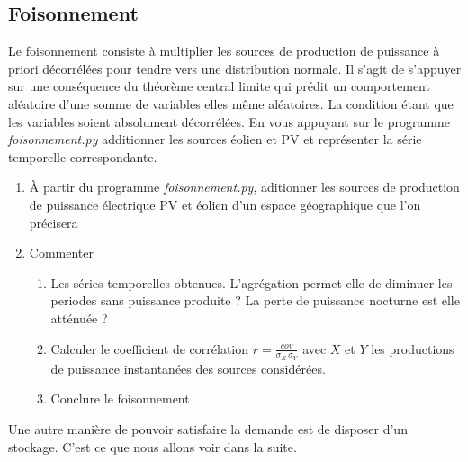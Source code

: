\documentclass[12pt,french]{article}
\newcommand{\tmtextit}[1]{{\itshape{#1}}}
\begin{document}
\subsection{Foisonnement}

Le foisonnement consiste à multiplier les sources de production de puissance
à priori décorrélées pour tendre vers une distribution normale. Il s'agit de s'appuyer sur une conséquence du théorème central limite qui prédit un
comportement aléatoire d'une somme de variables elles même aléatoires. La
condition étant que les variables soient absolument décorrélées. En vous
appuyant sur le programme \tmtextit{foisonnement.py} additionner les sources
éolien et PV et représenter la série temporelle correspondante.

\begin{enumerate}
  \item À partir du programme \tmtextit{foisonnement.py}, aditionner les
  sources de production de puissance électrique PV et éolien d'un espace géographique que l'on précisera 
  
  \item Commenter
  \begin{enumerate}
    \item Les séries temporelles obtenues. L'agrégation permet elle de
    diminuer les periodes sans puissance produite ? La perte de puissance
    nocturne est elle atténuée ?
     
    \item Calculer le coefficient de corrélation $r=\frac{cov}{\sigma_X \, \sigma_Y}$ avec $X$ et $Y$ les productions de puissance instantanées des sources considérées. 
    
    \item Conclure le foisonnement
  \end{enumerate}
\end{enumerate}

Une autre manière de pouvoir satisfaire la demande est de disposer d'un stockage. C'est ce que nous allons voir dans la suite.

%
%
%	
%	
\end{document}
